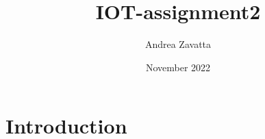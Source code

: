 \documentclass{article}
\title{IOT-assignment2}
\author{Andrea Zavatta}
\date{November 2022}
\begin{document}
\maketitle

\section{Introduction}
\end{document}
